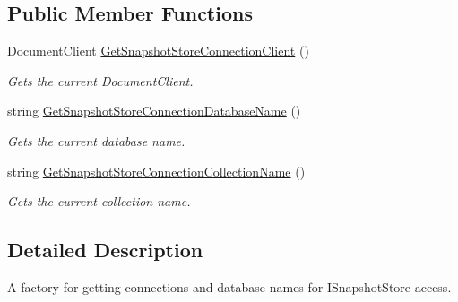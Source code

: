 \subsection*{Public Member Functions}
\begin{DoxyCompactItemize}
\item 
Document\+Client \hyperlink{interfaceCqrs_1_1Azure_1_1DocumentDb_1_1Events_1_1IAzureDocumentDbSnapshotStoreConnectionStringFactory_ad28e9645fa8039eede157719e4d026b3_ad28e9645fa8039eede157719e4d026b3}{Get\+Snapshot\+Store\+Connection\+Client} ()
\begin{DoxyCompactList}\small\item\em Gets the current Document\+Client. \end{DoxyCompactList}\item 
string \hyperlink{interfaceCqrs_1_1Azure_1_1DocumentDb_1_1Events_1_1IAzureDocumentDbSnapshotStoreConnectionStringFactory_a1a6c06eeccfae14bcacae499972a4bcf_a1a6c06eeccfae14bcacae499972a4bcf}{Get\+Snapshot\+Store\+Connection\+Database\+Name} ()
\begin{DoxyCompactList}\small\item\em Gets the current database name. \end{DoxyCompactList}\item 
string \hyperlink{interfaceCqrs_1_1Azure_1_1DocumentDb_1_1Events_1_1IAzureDocumentDbSnapshotStoreConnectionStringFactory_ad300bf0d143c3ad5d3bb1dfa22422645_ad300bf0d143c3ad5d3bb1dfa22422645}{Get\+Snapshot\+Store\+Connection\+Collection\+Name} ()
\begin{DoxyCompactList}\small\item\em Gets the current collection name. \end{DoxyCompactList}\end{DoxyCompactItemize}


\subsection{Detailed Description}
A factory for getting connections and database names for I\+Snapshot\+Store access. 




